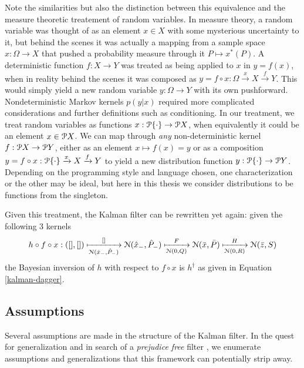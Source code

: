 Note the similarities but also the distinction between this equivalence and the measure theoretic treatement of random variables. In measure theory, a random variable was thought of as an element $x\in X$ with some mysterious uncertainty to it, but behind the scenes it was actually a mapping from a sample space $x:\Omega \rightarrow X$ that pushed a probability measure through it $P \mapsto x^*(P)$. A deterministic function $f:X\rightarrow Y$ was treated as being applied to $x$ in $y = f(x)$, when in reality behind the scenes it was composed as $y = f\circ x : \Omega \xrightarrow{x} X \xrightarrow{f} Y$. This would simply yield a new random variable $y:\Omega\rightarrow Y$ with its own pushforward. Nondeterministic Markov kernels $p(y|x)$ required more complicated considerations and further definitions such as conditioning. In our treatment, we treat random variables as functions $x:\mathcal{P} \{\cdot\} \rightarrow \mathcal{P} X$, when equivalently it could be an element $x\in\mathcal{P} X$. We can map through \emph{any} non-deterministic kernel $f:\mathcal{P} X \rightarrow \mathcal{P} Y$, either as an element $x\mapsto f(x) = y$ or as a composition $y = f\circ x : \mathcal{P}\{\cdot\} \xrightarrow{x} X \xrightarrow{f} Y$ to yield a new distribution function $y:\mathcal{P}\{\cdot\} \rightarrow \mathcal{P} Y$. Depending on the programming style and language chosen, one characterization or the other may be ideal, but here in this thesis we consider distributions to be functions from the singleton.

Given this treatment, the Kalman filter can be rewritten yet again: given the following 3 kernels
\begin{equation}
    \label{kalman-mappings}
    h\circ f\circ x:
    ([],[])
    \xmapsto[\mathcal{N}(\hat{x}_-, \hat{P}_-)]{[]}
    \mathcal{N}(\hat{x}_-, \hat{P}_-)
    \xmapsto[\mathcal{N}(0,Q)]{F}
    \mathcal{N}(\bar{x}, \bar{P})
    \xmapsto[\mathcal{N}(0,R)]{H}
    \mathcal{N}(\bar{z}, S)
\end{equation}
the Bayesian inversion of $h$ with respect to $f\circ x$ is $h^\dagger$ as given in Equation \ref{kalman-dagger}.

\subsection{Assumptions}

Several assumptions are made in the structure of the Kalman filter. In the quest for generalization and in search of a \emph{prejudice free} filter \cite{some-moriba-paper}, we enumerate assumptions and generalizations that this framework can potentially strip away.


